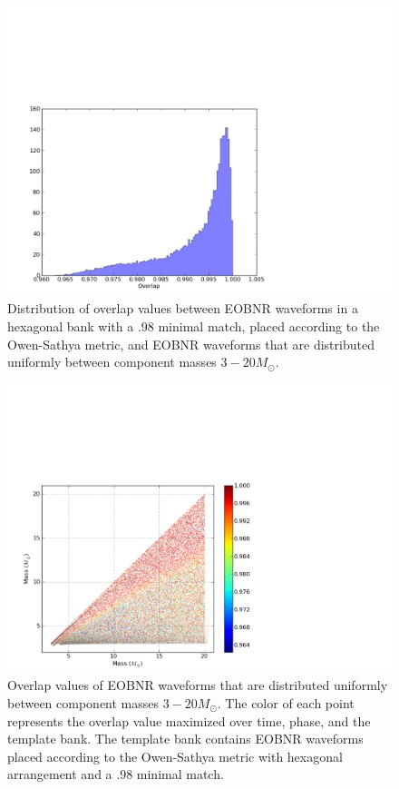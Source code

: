 \documentclass[aps,
prd,
amsmath,
amssymb,
twocolumn,
floatfix,
groupedaddress]{revtex4-1}
\begin{document}
\begin{figure}
\includegraphics[scale=0.04, clip=false, totalheight=0.3\textheight]{eob98hist.pdf}
\caption{\label{fig:eobnr98-hist}Distribution of overlap values between EOBNR waveforms in a hexagonal bank with a .98 minimal match, placed according to the Owen-Sathya metric, and EOBNR waveforms that are distributed uniformly between 
component masses $3 -20 M_{\odot}$.}
\end{figure}

\begin{figure}
\includegraphics[scale=0.04, clip=false, totalheight=0.3\textheight]{eob98bank.pdf}
\caption{\label{fig:eobnr98-bank}Overlap values of EOBNR waveforms that are distributed uniformly between component masses $3 -20 M_{\odot}$. The color of each point represents the overlap value maximized over time, phase, and the template bank. The template bank contains EOBNR waveforms placed according to the Owen-Sathya metric with hexagonal arrangement and a .98 minimal match.}
\end{figure}
\end{document}
